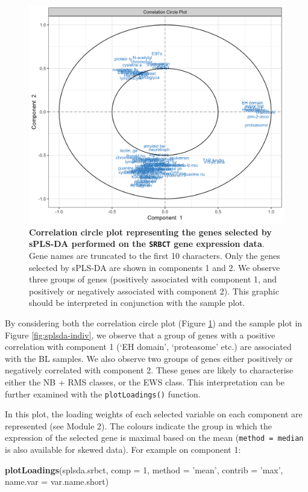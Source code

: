 \documentclass[]{book}
\newenvironment{Shaded}{\begin{snugshade}}{\end{snugshade}}
\newcommand{\KeywordTok}[1]{\textcolor[rgb]{0.13,0.29,0.53}{\textbf{#1}}}
\newcommand{\DataTypeTok}[1]{\textcolor[rgb]{0.13,0.29,0.53}{#1}}
\newcommand{\DecValTok}[1]{\textcolor[rgb]{0.00,0.00,0.81}{#1}}
\newcommand{\StringTok}[1]{\textcolor[rgb]{0.31,0.60,0.02}{#1}}
\newcommand{\NormalTok}[1]{#1}
\begin{document}
\begin{figure}

{\centering \includegraphics[width=0.5\linewidth]{Figures/PLSDA/splsda-var-1} 

}

\caption{\textbf{Correlation circle plot representing the genes
selected by sPLS-DA performed on the \texttt{SRBCT} gene expression
data}. Gene names are truncated to the first 10 characters. Only the
genes selected by sPLS-DA are shown in components 1 and 2. We observe
three groups of genes (positively associated with component 1, and
positively or negatively associated with component 2). This graphic
should be interpreted in conjunction with the sample plot.}\label{fig:splsda-var}
\end{figure}









By considering both the correlation circle plot (Figure
\ref{fig:splsda-var}) and the sample plot in Figure
\ref{fig:splsda-indiv}, we observe that a group of genes with a positive
correlation with component 1 (`EH domain', `proteasome' etc.) are
associated with the BL samples. We also observe two groups of genes
either positively or negatively correlated with component 2. These genes
are likely to characterise either the NB + RMS classes, or the EWS
class. This interpretation can be further examined with the
\texttt{plotLoadings()} function.

In this plot, the loading weights of each selected variable on each
component are represented (see Module 2). The colours indicate the group
in which the expression of the selected gene is maximal based on the
mean (\texttt{method\ =\ \textquotesingle{}median\textquotesingle{}} is
also available for skewed data). For example on component 1:

\begin{Shaded}
\begin{Highlighting}[]
\KeywordTok{plotLoadings}\NormalTok{(splsda.srbct, }\DataTypeTok{comp =} \DecValTok{1}\NormalTok{, }\DataTypeTok{method =} \StringTok{'mean'}\NormalTok{, }\DataTypeTok{contrib =} \StringTok{'max'}\NormalTok{, }
             \DataTypeTok{name.var =}\NormalTok{ var.name.short)}
\end{Highlighting}
\end{Shaded}
\end{document}
